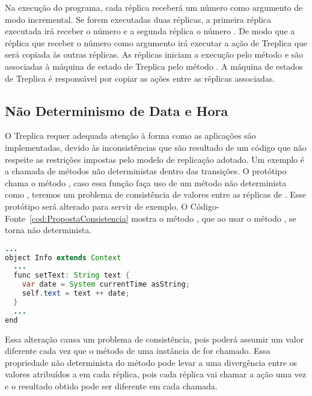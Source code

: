 Na execução do programa, cada réplica receberá um número como argumento de modo incremental. Se forem executadas duas réplicas, a primeira réplica executada irá receber o número  e a segunda réplica o número . De modo que a réplica que receber o número  como argumento irá executar a ação de Treplica que será copiada às outras réplicas. As réplicas iniciam a execução pelo método  e são associadas à máquina de estado de Treplica pelo método . A máquina de estados de Treplica é responsável por copiar as ações entre as réplicas associadas. 

\subsection{Não Determinismo de Data e Hora}
\label{sec:nddatahora}

O Treplica requer adequada atenção à forma como as aplicações são implementadas, devido às inconsistências que são resultado de um código que não respeite as restrições impostas pelo modelo de replicação adotado. Um exemplo é a chamada de métodos não deterministas dentro das transições. O protótipo  chama o método , caso essa função faça uso de um método não determinista como , teremos um problema de consistência de valores entre as réplicas de . Esse protótipo será alterado para servir de exemplo. O Código-Fonte~\ref{cod:PropostaConsistencia} mostra o método , que ao usar o método , se torna não determinista.

\begin{lstlisting}[language=Java, caption={Exemplo de método \textbf{setText:} não determinista}, label={cod:PropostaConsistencia}] 
...
object Info extends Context
  ...
  func setText: String text {
    var date = System currentTime asString;
    self.text = text ++ date;
  }
  ...
end
\end{lstlisting}
  
Essa alteração causa um problema de consistência, pois  poderá assumir um valor diferente cada vez que o método  de uma instância de  for chamado. Essa propriedade não determinista do método  pode levar a uma divergência entre os valores atribuídos a  em cada réplica, pois cada réplica vai chamar a ação uma vez e o resultado obtido pode ser diferente em cada chamada.

